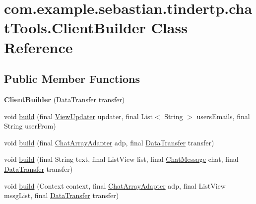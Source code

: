 \hypertarget{classcom_1_1example_1_1sebastian_1_1tindertp_1_1chatTools_1_1ClientBuilder}{}\section{com.\+example.\+sebastian.\+tindertp.\+chat\+Tools.\+Client\+Builder Class Reference}
\label{classcom_1_1example_1_1sebastian_1_1tindertp_1_1chatTools_1_1ClientBuilder}
\subsection*{Public Member Functions}
\begin{DoxyCompactItemize}
\item 
{\bfseries Client\+Builder} (\hyperlink{interfacecom_1_1example_1_1sebastian_1_1tindertp_1_1Interfaces_1_1DataTransfer}{Data\+Transfer} transfer)\hypertarget{classcom_1_1example_1_1sebastian_1_1tindertp_1_1chatTools_1_1ClientBuilder_ab8a1f8735877585aa3116450ac690cd5}{}\label{classcom_1_1example_1_1sebastian_1_1tindertp_1_1chatTools_1_1ClientBuilder_ab8a1f8735877585aa3116450ac690cd5}

\item 
void \hyperlink{classcom_1_1example_1_1sebastian_1_1tindertp_1_1chatTools_1_1ClientBuilder_a84c8904454dbc0c98dc5519567ed939b}{build} (final \hyperlink{interfacecom_1_1example_1_1sebastian_1_1tindertp_1_1Interfaces_1_1ViewUpdater}{View\+Updater} updater, final List$<$ String $>$ users\+Emails, final String user\+From)
\item 
void \hyperlink{classcom_1_1example_1_1sebastian_1_1tindertp_1_1chatTools_1_1ClientBuilder_a59e84af6f975cf618d2d36c2aa3a6d64}{build} (final \hyperlink{classcom_1_1example_1_1sebastian_1_1tindertp_1_1chatTools_1_1ChatArrayAdapter}{Chat\+Array\+Adapter} adp, final \hyperlink{interfacecom_1_1example_1_1sebastian_1_1tindertp_1_1Interfaces_1_1DataTransfer}{Data\+Transfer} transfer)
\item 
void \hyperlink{classcom_1_1example_1_1sebastian_1_1tindertp_1_1chatTools_1_1ClientBuilder_ac09b2b950cd7116f84bacc5a366ec33d}{build} (final String text, final List\+View list, final \hyperlink{classcom_1_1example_1_1sebastian_1_1tindertp_1_1chatTools_1_1ChatMessage}{Chat\+Message} chat, final \hyperlink{interfacecom_1_1example_1_1sebastian_1_1tindertp_1_1Interfaces_1_1DataTransfer}{Data\+Transfer} transfer)
\item 
void \hyperlink{classcom_1_1example_1_1sebastian_1_1tindertp_1_1chatTools_1_1ClientBuilder_a59be5c24aa674e233fe21eac707cc114}{build} (Context context, final \hyperlink{classcom_1_1example_1_1sebastian_1_1tindertp_1_1chatTools_1_1ChatArrayAdapter}{Chat\+Array\+Adapter} adp, final List\+View mssg\+List, final \hyperlink{interfacecom_1_1example_1_1sebastian_1_1tindertp_1_1Interfaces_1_1DataTransfer}{Data\+Transfer} transfer)
\end{DoxyCompactItemize}
